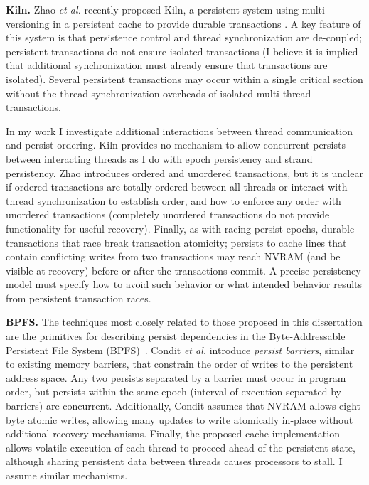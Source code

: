 \textbf{Kiln.}
Zhao \emph{et al.} recently proposed Kiln, a persistent system using multi-versioning in a persistent cache to provide durable transactions \cite{ZhaoLi13}.
A key feature of this system is that persistence control and thread synchronization are de-coupled; persistent transactions do not ensure isolated transactions (I believe it is implied that additional synchronization must already ensure that transactions are isolated).
Several persistent transactions may occur within a single critical section without the thread synchronization overheads of isolated multi-thread transactions.

In my work I investigate additional interactions between thread communication and persist ordering.
Kiln provides no mechanism to allow concurrent persists between interacting threads as I do with epoch persistency and strand persistency.
Zhao introduces ordered and unordered transactions, but it is unclear if ordered transactions are totally ordered between all threads or interact with thread synchronization to establish order, and how to enforce any order with unordered transactions (completely unordered transactions do not provide functionality for useful recovery).
Finally, as with racing persist epochs, durable transactions that race break transaction atomicity; persists to cache lines that contain conflicting writes from two transactions may reach NVRAM (and be visible at recovery) before or after the transactions commit.
A precise persistency model must specify how to avoid such behavior or what intended behavior results from persistent transaction races.

\textbf{BPFS.}
The techniques most closely related to those proposed in this dissertation are the primitives for describing persist dependencies in the Byte-Addressable Persistent File System (BPFS)~\cite{ConditNightingale09}.
Condit \emph{et al.} introduce \emph{persist barriers}, similar to existing memory barriers, that constrain the order of writes to the persistent address space.
Any two persists separated by a barrier must occur in program order, but persists within the same epoch (interval of execution separated by barriers) are concurrent.
Additionally, Condit assumes that NVRAM allows eight byte atomic writes, allowing many updates to write atomically in-place without additional recovery mechanisms.
Finally, the proposed cache implementation allows volatile execution of each thread to proceed ahead of the persistent state, although sharing persistent data between threads causes processors to stall.
I assume similar mechanisms.

